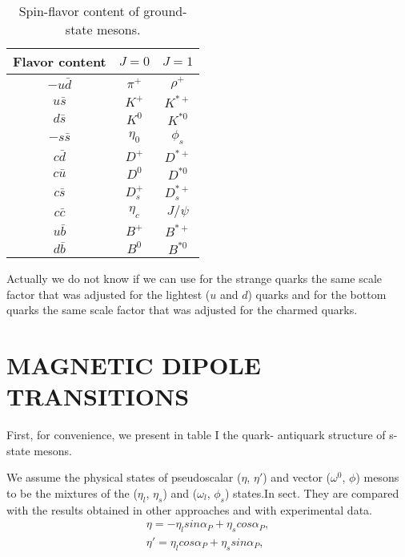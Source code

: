 \documentclass[12pt,epsf]{article}
\begin{document}
\begin{multicols}{2}%
\begin{table}[H]
\begin{center}
\renewcommand{\tablename}{TABLE}%
\caption{\footnotesize Spin-flavor content of ground-state mesons.}
\begin{tabular}{ccc}
\toprule
 {Flavor content} &{ \(J=0\)} & \(J=1\) \\
 \midrule
  \(-u\bar{d}\) & \(\pi^+\) & \(\rho^+\)\\ 
  \(u\bar{s}\) & \(K^+\) & \(K^{*+}\)\\
  \(d\bar{s}\) & \(K^0\) & \(K^{*0}\)\\
  \(-s\bar{s}\) & \(\eta_0\) & \(\phi_s\)\\
  \(c\bar{d}\) & \(D^+\) & \(D^{*+}\)\\
  \(c\bar{u}\) & \(D^0\) & \(D^{*0}\)\\
  \(c\bar{s}\) & \(D^+_s\) & \(D^{*+}_s\)\\
  \(c\bar{c}\) & \(\eta_c\) & \(J/\psi\)\\ 
  \(u\bar{b}\) & \(B^+\) & \(B^{*+}\)\\
  \(d\bar{b}\) & \(B^0\) & \(B^{*0}\)\\ 
 \bottomrule
\end{tabular}
\end{center}
\end{table}

Actually we do not know if we can use for the strange quarks the same scale factor that was adjusted for the lightest (\(u\) and \(d\)) quarks and for the bottom quarks the same scale factor that was adjusted for the charmed quarks. 
\section{\small\bf MAGNETIC DIPOLE TRANSITIONS}

First, for convenience, we present in table I the quark- antiquark structure of s-state mesons.

We assume the physical states of pseudoscalar (\(\eta\), \(\eta'\)) and vector (\(\omega^0\), \(\phi\)) mesons to be the mixtures of the (\(\eta_l\), \(\eta_s\)) and (\(\omega_l\), \(\phi_s\)) states.In sect. They are compared with the results obtained in other approaches and with experimental data. 
\begin{equation}
\begin{split}
\eta=-\eta_l sin\alpha_P+\eta_s cos\alpha_P, \\
\eta'=\eta_l cos\alpha_P+\eta_s sin\alpha_P,\\
\end{split} 
\end{equation}


\end{multicols}
\end{document}
